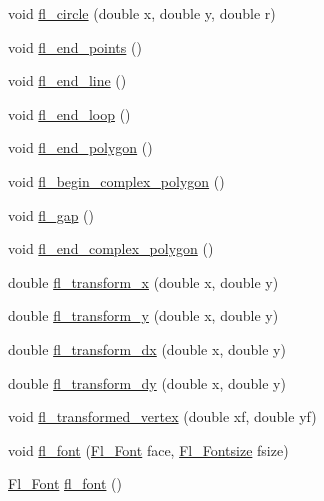 \begin{DoxyCompactItemize}
\item 
void \hyperlink{group__fl__drawings_gac4540eaf7b5f23944cf332fc8f81f57e}{fl\+\_\+circle} (double x, double y, double r)
\item 
void \hyperlink{group__fl__drawings_gaf715c7239d76c49737eb514e440490b5}{fl\+\_\+end\+\_\+points} ()
\item 
void \hyperlink{group__fl__drawings_ga9f4bbb29153922288a9eebe25352571b}{fl\+\_\+end\+\_\+line} ()
\item 
void \hyperlink{group__fl__drawings_ga5b2013850fe739839e437ef942602532}{fl\+\_\+end\+\_\+loop} ()
\item 
void \hyperlink{group__fl__drawings_gad032c5f7637d440ff545285f2dcc2f44}{fl\+\_\+end\+\_\+polygon} ()
\item 
void \hyperlink{group__fl__drawings_ga11c03773e045738994ffa78acc35c51d}{fl\+\_\+begin\+\_\+complex\+\_\+polygon} ()
\item 
void \hyperlink{group__fl__drawings_ga29448f3a419a65645e3f082c65d1df14}{fl\+\_\+gap} ()
\item 
void \hyperlink{group__fl__drawings_gaca7783f2d66b9a65a3201516bfd74694}{fl\+\_\+end\+\_\+complex\+\_\+polygon} ()
\item 
double \hyperlink{group__fl__drawings_gabba2c9a8d7598dca64572a63e592a864}{fl\+\_\+transform\+\_\+x} (double x, double y)
\item 
double \hyperlink{group__fl__drawings_gaf68ee505a886277680f704a86ea7ea86}{fl\+\_\+transform\+\_\+y} (double x, double y)
\item 
double \hyperlink{group__fl__drawings_ga5982191f71657bff8c38e19206869ea8}{fl\+\_\+transform\+\_\+dx} (double x, double y)
\item 
double \hyperlink{group__fl__drawings_ga38e48d06963d55b2a3001f09355824a8}{fl\+\_\+transform\+\_\+dy} (double x, double y)
\item 
void \hyperlink{group__fl__drawings_ga4069ce7f3661ee913869bf71dbb5d5e7}{fl\+\_\+transformed\+\_\+vertex} (double xf, double yf)
\item 
void \hyperlink{group__fl__attributes_ga80203d2dd1e06550e7a35d6bb72f9bd6}{fl\+\_\+font} (\hyperlink{_enumerations_8_h_a2ac46d9f082834b969fffe490a03a709}{Fl\+\_\+\+Font} face, \hyperlink{_enumerations_8_h_ad58927f5c691454480f7cd28362502f1}{Fl\+\_\+\+Fontsize} fsize)
\item 
\hyperlink{_enumerations_8_h_a2ac46d9f082834b969fffe490a03a709}{Fl\+\_\+\+Font} \hyperlink{group__fl__attributes_gad234d90fe63191609ec196e1b8041d1a}{fl\+\_\+font} ()
\item 

\end{DoxyCompactItemize}
